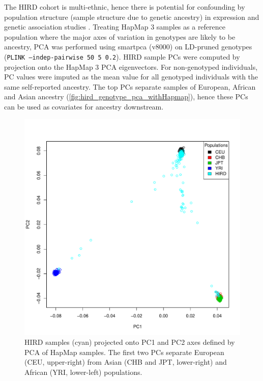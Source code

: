 The \gls{HIRD} cohort is multi-ethnic, hence there is potential for confounding by population structure (sample structure due to genetic ancestry) in expression and genetic association studies \autocite{price2006PrincipalComponentsAnalysis,eu-ahsunthornwattana2014ComparisonMethodsAccount,brown2018ExpressionReflectsPopulation}.
Treating HapMap 3 samples as a reference population where the major axes of variation in genotypes are likely to be ancestry, \gls{PCA} was performed using smartpca (v8000) on \gls{LD}-pruned genotypes (\texttt{PLINK --indep-pairwise 50 5 0.2}).
\gls{HIRD} sample \glspl{PC} were computed by projection onto the HapMap 3 \gls{PCA} eigenvectors.
For non-genotyped individuals, \gls{PC} values were imputed as the mean value for all genotyped individuals with the same self-reported ancestry.
The top \glspl{PC} separate samples of European, African and Asian ancestry (\autoref{fig:hird_genotype_pca_withHapmap}), hence these \glspl{PC} can be used as covariates for ancestry downstream.

\begin{figure}
    \includegraphics[width=1.0\textwidth]{mainmatter/figures/chapter_02/coreex_eQTLflu_20171204.gencall.smajor.impute_sex.qc3.pruned.hapmap_merged.flipped.pca.evec.pdf}
    \caption{HIRD samples (cyan) projected onto \gls{PC}1 and PC2 axes defined by PCA of HapMap samples. The first two PCs separate European (CEU, upper-right) from Asian (CHB and JPT, lower-right) and African (YRI, lower-left) populations.}
    \label{fig:hird_genotype_pca_withHapmap}
\end{figure}

